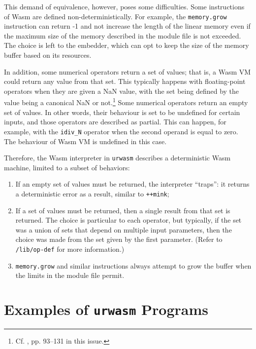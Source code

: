\documentclass[twoside]{article}
\begin{document}
This demand of equivalence, however, poses some difficulties. Some instructions of Wasm are defined non-determinis\-tically. For example, the \lstinline[style=inlinecode]{memory.grow} instruction can return -1 and not increase the length of the linear memory even if the maximum size of the memory described in the module file is not exceeded. The choice is left to the embedder, which can opt to keep the size of the memory buffer based on its resources.

In addition, some numerical operators return a set of values; that is, a Wasm VM could return any value from that set. This typically happens with floating-point operators when they are given a NaN value, with the set being defined by the value being a canonical NaN or not.\footnote{Cf. \citet{Davis2024}, pp. 93–131 in this issue.}  Some numerical operators return an empty set of values. In other words, their behaviour is set to be undefined for certain inputs, and those operators are described as partial. This can happen, for example, with the \lstinline[style=inlinecode]{idiv_N} operator when the second operand is equal to zero. The behaviour of Wasm VM is undefined in this case.

Therefore, the Wasm interpreter in \lstinline[style=inlinecode]{urwasm} describes a deterministic Wasm machine, limited to a subset of behaviors:

\begin{enumerate}
  \item  If an empty set of values must be returned, the interpreter “traps”:  it returns a deterministic error as a result, similar to \lstinline[style=inlinecode]{++mink};
  \item  If a set of values must be returned, then a single result from that set is returned. The choice is particular to each operator, but typically, if the set was a union of sets that depend on multiple input parameters, then the choice was made from the set given by the first parameter. (Refer to \lstinline[style=inlinecode]{/lib/op-def} for more information.)
  \item  \lstinline[style=inlinecode]{memory.grow} and similar instructions always attempt to grow the buffer when the limits in the module file permit.
\end{enumerate}


\section{Examples of \texttt{urwasm} Programs}
\end{document}
